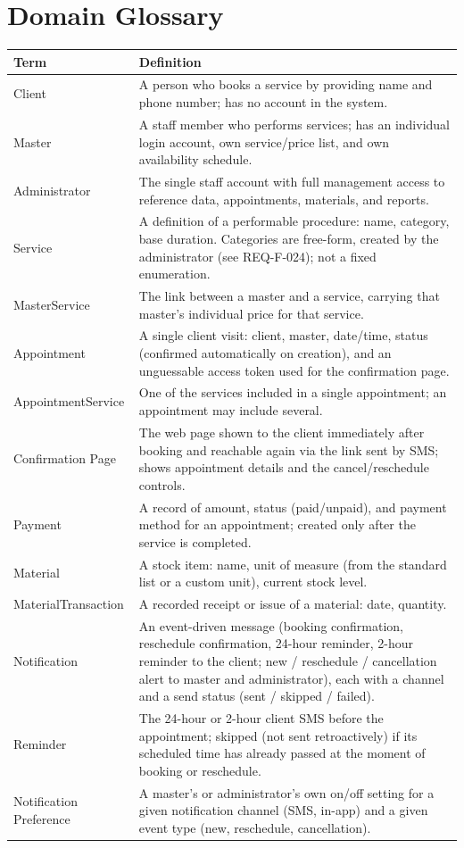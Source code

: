 \documentclass[11pt,a4paper]{article}
\begin{document}
\section{Domain Glossary}
\label{sec:glossary}

\begin{longtable}{L{3.4cm}L{10.6cm}}
\toprule
Term & Definition \\
\midrule
\endhead
Client & A person who books a service by providing name and phone number;
  has no account in the system. \\
Master & A staff member who performs services; has an individual login
  account, own service/price list, and own availability schedule. \\
Administrator & The single staff account with full management access to
  reference data, appointments, materials, and reports. \\
Service & A definition of a performable procedure: name, category, base
  duration. Categories are free-form, created by the administrator (see
  REQ-F-024); not a fixed enumeration. \\
MasterService & The link between a master and a service, carrying that
  master's individual price for that service. \\
Appointment & A single client visit: client, master, date/time, status
  (confirmed automatically on creation), and an unguessable access token
  used for the confirmation page. \\
AppointmentService & One of the services included in a single appointment;
  an appointment may include several. \\
Confirmation Page & The web page shown to the client immediately after
  booking and reachable again via the link sent by SMS; shows appointment
  details and the cancel/reschedule controls. \\
Payment & A record of amount, status (paid/unpaid), and payment method for
  an appointment; created only after the service is completed. \\
Material & A stock item: name, unit of measure (from the standard list or a
  custom unit), current stock level. \\
MaterialTransaction & A recorded receipt or issue of a material: date,
  quantity. \\
Notification & An event-driven message (booking confirmation, reschedule
  confirmation, 24-hour reminder, 2-hour reminder to the client; new /
  reschedule / cancellation alert to master and administrator), each with a
  channel and a send status (sent / skipped / failed). \\
Reminder & The 24-hour or 2-hour client SMS before the appointment; skipped
  (not sent retroactively) if its scheduled time has already passed at the
  moment of booking or reschedule. \\
Notification Preference & A master's or administrator's own on/off setting
  for a given notification channel (SMS, in-app) and a given event type
  (new, reschedule, cancellation). \\
\bottomrule
\end{longtable}
\end{document}
